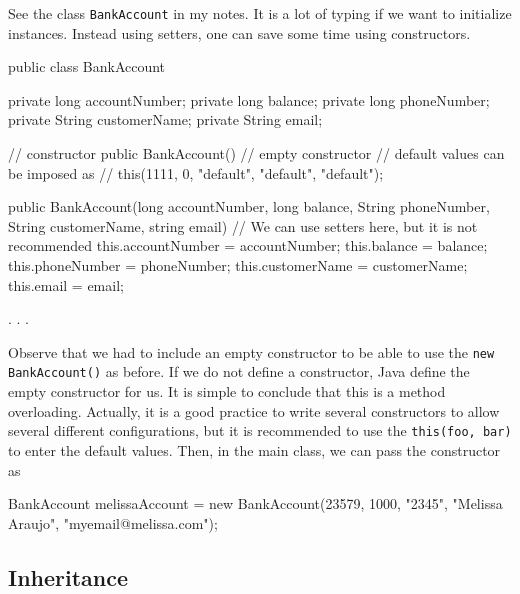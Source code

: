 See the class \verb|BankAccount| in my notes. It is a lot of typing if we want to initialize instances.
Instead using setters, one can save some time using constructors. 
\begin{listing}{1}
public class BankAccount {

    private long accountNumber;
    private long balance;
    private long phoneNumber;
    private String customerName;
    private String email;

    // constructor
    public BankAccount() {
    // empty constructor
    // default values can be imposed as 
    // this(1111, 0, "default", "default", "default"); 
    }

    public BankAccount(long accountNumber, long balance, String phoneNumber, String customerName, 
        string email) {
        // We can use setters here, but it is not recommended 
        this.accountNumber = accountNumber;
        this.balance = balance;
        this.phoneNumber = phoneNumber;
        this.customerName = customerName;
        this.email = email;
    }

    . . .
}
\end{listing}
Observe that we had to include an empty constructor to be able to use the \verb|new BankAccount()| 
as before. If we do not define a constructor, Java define the empty constructor for us. 
It is simple to conclude that this is a method overloading.
Actually, it is a good practice to write several constructors to allow several different configurations, 
but it is recommended to use the \verb|this(foo, bar)| to enter the default values. 
Then, in the main class, we can pass the constructor as 
\begin{listing}{1}
BankAccount melissaAccount = new BankAccount(23579, 1000, "2345", "Melissa Araujo", "myemail@melissa.com");
\end{listing}


\subsection{Inheritance}

